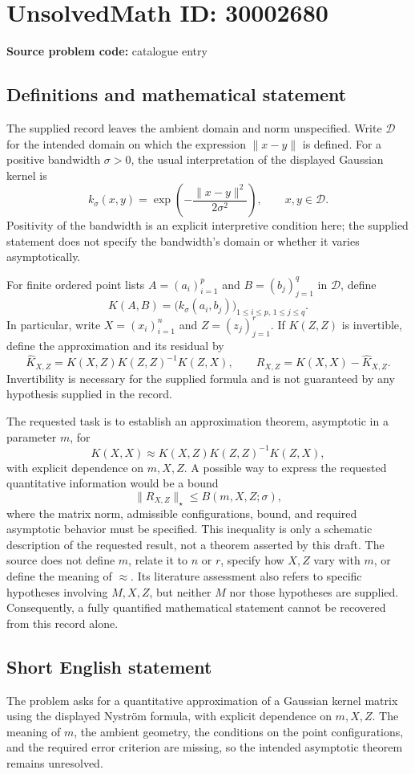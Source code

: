 \documentclass[11pt]{article}
\begin{document}
\section*{UnsolvedMath ID: 30002680}
\textbf{Source problem code:} catalogue entry
\subsection{Definitions and mathematical statement}
The supplied record leaves the ambient domain and norm unspecified. Write \(\mathcal D\) for the intended domain on which the expression \(\lVert x-y\rVert\) is defined. For a positive bandwidth \(\sigma>0\), the usual interpretation of the displayed Gaussian kernel is
\[
k_\sigma(x,y)=\exp\!\left(-\frac{\lVert x-y\rVert^2}{2\sigma^2}\right),\qquad x,y\in\mathcal D.
\]
Positivity of the bandwidth is an explicit interpretive condition here; the supplied statement does not specify the bandwidth's domain or whether it varies asymptotically.

For finite ordered point lists \(A=(a_i)_{i=1}^{p}\) and \(B=(b_j)_{j=1}^{q}\) in \(\mathcal D\), define
\[
K(A,B)=\bigl(k_\sigma(a_i,b_j)\bigr)_{1\le i\le p,\,1\le j\le q}.
\]
In particular, write \(X=(x_i)_{i=1}^{n}\) and \(Z=(z_j)_{j=1}^{r}\). If \(K(Z,Z)\) is invertible, define the approximation and its residual by
\[
\widehat K_{X,Z}=K(X,Z)K(Z,Z)^{-1}K(Z,X),\qquad
R_{X,Z}=K(X,X)-\widehat K_{X,Z}.
\]
Invertibility is necessary for the supplied formula and is not guaranteed by any hypothesis supplied in the record.

The requested task is to establish an approximation theorem, asymptotic in a parameter \(m\), for
\[
K(X,X)\approx K(X,Z)K(Z,Z)^{-1}K(Z,X),
\]
with explicit dependence on \(m,X,Z\). A possible way to express the requested quantitative information would be a bound
\[
\lVert R_{X,Z}\rVert_{\star}\le B(m,X,Z;\sigma),
\]
where the matrix norm, admissible configurations, bound, and required asymptotic behavior must be specified. This inequality is only a schematic description of the requested result, not a theorem asserted by this draft. The source does not define \(m\), relate it to \(n\) or \(r\), specify how \(X,Z\) vary with \(m\), or define the meaning of \(\approx\). Its literature assessment also refers to specific hypotheses involving \(M,X,Z\), but neither \(M\) nor those hypotheses are supplied. Consequently, a fully quantified mathematical statement cannot be recovered from this record alone.
\subsection{Short English statement}
The problem asks for a quantitative approximation of a Gaussian kernel matrix using the displayed Nystr\"om formula, with explicit dependence on \(m,X,Z\). The meaning of \(m\), the ambient geometry, the conditions on the point configurations, and the required error criterion are missing, so the intended asymptotic theorem remains unresolved.
\end{document}
